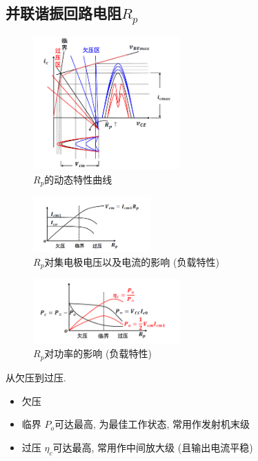 \documentclass[a4paper]{report}
\begin{document}
\subsection{并联谐振回路电阻$R_p$}
\begin{figure}[H]
\centering
\includegraphics[width=0.5\textwidth]{power_amp_graph_6.png}
\caption{$R_p$的动态特性曲线}
\end{figure}
\begin{figure}[H]
\centering
\includegraphics[width=0.4\textwidth]{power_amp_graph_7.png}
\caption{$R_p$对集电极电压以及电流的影响 (负载特性)}
\end{figure}
\begin{figure}[H]
\centering
\includegraphics[width=0.5\textwidth]{power_amp_graph_8.png}
\caption{$R_p$对功率的影响 (负载特性)}
\end{figure}
从欠压到过压. 
\begin{itemize}
  \item 欠压
  \item 临界 $P_o$可达最高, 为最佳工作状态, 常用作发射机末级
  \item 过压 $\eta_c$可达最高, 常用作中间放大级 (且输出电流平稳)
\end{itemize}
\end{document}
